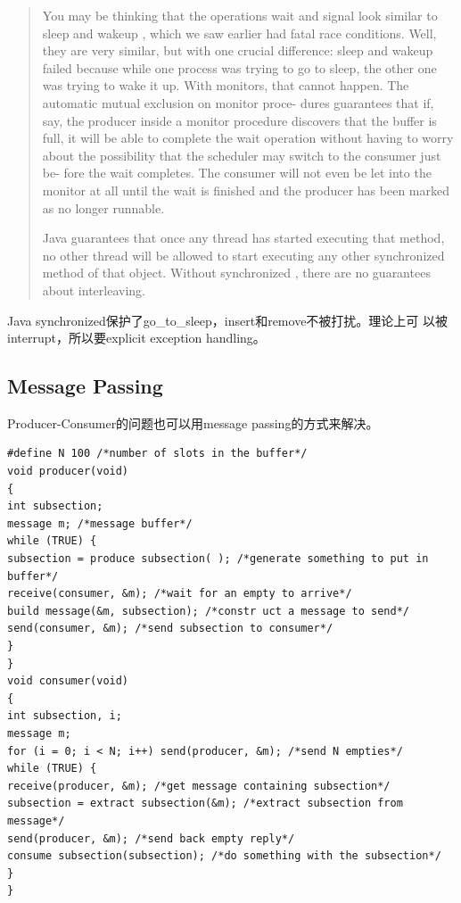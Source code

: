 \documentclass[a4paper]{article}
\begin{document}
\begin{quote}
        You may be thinking that the operations wait and signal look similar to sleep
and wakeup , which we saw earlier had fatal race conditions. Well, they are very
similar, but with one crucial difference: sleep and wakeup failed because while one
process was trying to go to sleep, the other one was trying to wake it up. With
monitors, that cannot happen. The automatic mutual exclusion on monitor proce-
dures guarantees that if, say, the producer inside a monitor procedure discovers that
the buffer is full, it will be able to complete the wait operation without having to
worry about the possibility that the scheduler may switch to the consumer just be-
fore the wait completes. The consumer will not even be let into the monitor at all
until the wait is finished and the producer has been marked as no longer runnable.


Java guarantees that once any thread has started executing that method,
no other thread will be allowed to start executing any other synchronized method
of that object. Without synchronized , there are no guarantees about interleaving.
\end{quote}
Java synchronized保护了go\_to\_sleep，insert和remove不被打扰。理论上可
以被interrupt，所以要explicit exception handling。

\subsection{Message Passing}
Producer-Consumer的问题也可以用message passing的方式来解决。

\begin{centering}
\begin{verbatim}
#define N 100 /*number of slots in the buffer*/
void producer(void)
{
int subsection;
message m; /*message buffer*/
while (TRUE) {
subsection = produce subsection( ); /*generate something to put in buffer*/
receive(consumer, &m); /*wait for an empty to arrive*/
build message(&m, subsection); /*constr uct a message to send*/
send(consumer, &m); /*send subsection to consumer*/
}
}
void consumer(void)
{
int subsection, i;
message m;
for (i = 0; i < N; i++) send(producer, &m); /*send N empties*/
while (TRUE) {
receive(producer, &m); /*get message containing subsection*/
subsection = extract subsection(&m); /*extract subsection from message*/
send(producer, &m); /*send back empty reply*/
consume subsection(subsection); /*do something with the subsection*/
}
}
\end{verbatim}
\end{centering}
\end{document}
